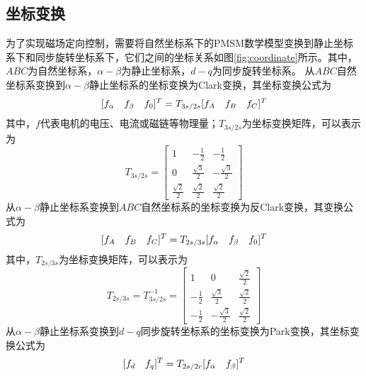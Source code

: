 \subsection{坐标变换}
为了实现磁场定向控制，需要将自然坐标系下的PMSM数学模型变换到静止坐标系下和同步旋转坐标系下，它们之间的坐标关系如图\ref{fig:coordinate}所示。其中，$ABC$为自然坐标系，$\alpha-\beta$为静止坐标系，$d-q$为同步旋转坐标系。
从$ABC$自然坐标系变换到$\alpha-\beta$静止坐标系的坐标变换为Clark变换，其坐标变换公式为
\begin{equation}
\centering
[f_\alpha \quad f_\beta \quad f_0]^T=T_{3s/2s}[f_A \quad f_B \quad f_C]^T
\end{equation}
其中，$f$代表电机的电压、电流或磁链等物理量；$T_{3s/2s}$为坐标变换矩阵，可以表示为
\begin{equation}
\label{ }
T_{3s/2s}=\left[
\begin{array}{ccc}
  1 & -\frac{1}{2} & -\frac{1}{2}  \\
  0 & \frac{\sqrt{3}}{2} & -\frac{\sqrt{3}}{2}  \\
  \frac{\sqrt{2}}{2} & \frac{\sqrt{2}}{2} & \frac{\sqrt{2}}{2} 
\end{array}
\right]
\end{equation}
从$\alpha-\beta$静止坐标系变换到$ABC$自然坐标系的坐标变换为反Clark变换，其变换公式为
\begin{equation}
\centering
[f_A \quad f_B \quad f_C]^T=T_{2s/3s}[f_\alpha \quad f_\beta \quad f_0]^T
\end{equation}
其中，$T_{2s/3s}$为坐标变换矩阵，可以表示为
\begin{equation}
T_{2s/3s}=T_{3s/2s}^{-1}=\left[
\begin{array}{ccc}
  1 & 0 & \frac{\sqrt{2}}{2}  \\
  -\frac{1}{2} & \frac{\sqrt{3}}{2} & \frac{\sqrt{2}}{2}  \\
  -\frac{1}{2} & -\frac{\sqrt{3}}{2} & \frac{\sqrt{2}}{2}  
\end{array}
\right]
\end{equation}
从$\alpha-\beta$静止坐标系变换到$d-q$同步旋转坐标系的坐标变换为Park变换，其坐标变换公式为
\begin{equation}
\centering
[f_d \quad f_q]^T=T_{2s/2r}[f_\alpha \quad f_\beta]^T
\end{equation}
